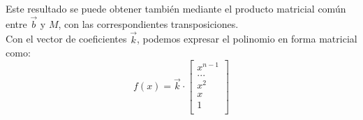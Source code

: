 \documentclass[12pt]{article}
\begin{document}
Este resultado se puede obtener tambi\'en mediante el producto matricial com\'un entre $\vec{b}$ y $M$, con las correspondientes transposiciones.\\

Con el vector de coeficientes $\vec{k}$, podemos expresar el polinomio en forma matricial como:
\[ f(x) = \vec{k} \cdot 
\begin{bmatrix}
    x^{n-1}\\
	...\\
	x^2\\
	x\\
	1\\
\end{bmatrix}
\]
\end{document}

